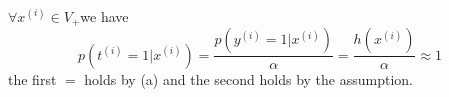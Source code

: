 \begin{answer}
 $\forall x^{(i)}\in V_+ $we have $$ p(t^{(i)}=1|x^{(i)})=\frac{p(y^{(i)}=1|x^{(i)})}{\alpha}=\frac{h(x^{(i)})}{\alpha}\approx 1$$
the first $ = $ holds by (a) and the second holds by the assumption.
\end{answer}

